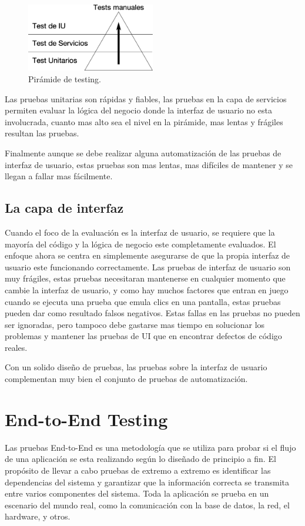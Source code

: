 \begin{figure}
\centering
\includegraphics[width=0.5\textwidth]{graphics/pyramid.eps}
\caption{Pirámide de testing.}
\label{piramide}
\end{figure}

Las pruebas unitarias son rápidas y fiables, las pruebas en la capa de servicios
permiten evaluar la lógica del negocio donde la interfaz de usuario no esta
involucrada, cuanto mas alto sea el nivel en la pirámide, mas lentas y frágiles
resultan las pruebas.

Finalmente aunque se debe realizar alguna automatización de las pruebas de
interfaz de usuario, estas pruebas son mas lentas, mas difíciles de mantener y
se llegan a fallar mas fácilmente.

\subsection{La capa de interfaz}
Cuando el foco de la evaluación es la interfaz de usuario, se requiere que la
mayoría del código y la lógica de negocio este completamente evaluados. El
enfoque ahora se centra en simplemente asegurarse de que la propia interfaz de
usuario este funcionando correctamente. Las pruebas de interfaz de usuario son
muy frágiles, estas pruebas necesitaran mantenerse en cualquier momento que
cambie la interfaz de usuario, y como hay muchos factores que entran en juego
cuando se ejecuta una prueba que emula clics en una pantalla, estas pruebas
pueden dar como resultado falsos negativos. Estas fallas en las pruebas no
pueden ser ignoradas, pero tampoco debe gastarse mas tiempo en solucionar los
problemas y mantener las pruebas de UI que en encontrar defectos de código
reales.

Con un solido diseño de pruebas, las pruebas sobre la interfaz de usuario
complementan muy bien el conjunto de pruebas de automatización.

\section{End-to-End Testing}
Las pruebas End-to-End es una metodología que se utiliza para probar si el flujo
de una aplicación se esta realizando según lo diseñado de principio a fin. El
propósito de llevar a cabo pruebas de extremo a extremo es identificar las
dependencias del sistema y garantizar que la información correcta se transmita
entre varios componentes del sistema. Toda la aplicación se prueba en un
escenario del mundo real, como la comunicación con la base de datos, la red, el
hardware, y otros.

